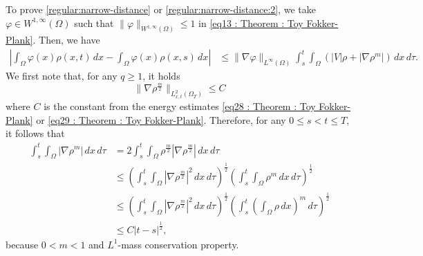 \documentclass{amsart}
\numberwithin{equation}{section}
\begin{document}
To prove \eqref{regular:narrow-distance} or \eqref{regular:narrow-distance:2}, we take $\varphi \in W^{1,\infty}(\Omega)$ such that $\|\varphi\|_{W^{1,\infty}(\Omega)} \leq 1$ in \eqref{eq13 : Theorem : Toy Fokker-Plank}. Then, we have
\begin{equation}\label{eq26 : Theorem : Toy Fokker-Plank}
\begin{aligned}
 \left | \int_{\Omega}\varphi(x) \rho(x,t) \,dx - \int_{\Omega}\varphi(x) \rho(x,s)\,dx \right |
&\leq \|\nabla \varphi\|_{L^\infty(\Omega)} \int_{s}^{t} \int_{\Omega}  \left (| V |\rho + | \nabla  \rho^m | \right) \,dx\,d\tau.%
\end{aligned}
\end{equation}
We first note that, for any $q\geq 1$, it holds
\begin{equation*}
\|\nabla \rho^{\frac{m}{2}}\|_{L^{2}_{x,t}(\Omega_T)} \leq C
\end{equation*}
where $C$ is the constant from the energy estimates \eqref{eq28 : Theorem : Toy Fokker-Plank} or \eqref{eq29 : Theorem : Toy Fokker-Plank}.
Therefore, for any $0 \leq s<t \leq T$, it follows that 
\begin{equation}\label{eq30 : Theorem : Toy Fokker-Plank}
\begin{aligned}
  \int_{s}^{t} \int_{\Omega}   | \nabla  \rho^m |  \,dx\,d\tau %
&= 2\int_{s}^{t} \int_{\Omega}   \rho^{\frac{m}{2}} \left| \nabla  \rho^{\frac{m}{2}} \right| \,dx\,d\tau\\
&\leq \left( \int_{s}^{t} \int_{\Omega}   \left| \nabla  \rho^{\frac{m}{2}} \right|^2 \,dx\,d\tau \right)^{\frac{1}{2}}\left( \int_{s}^{t} \int_{\Omega}   \rho^m \,dx\,d\tau \right)^{\frac{1}{2}}\\
&\leq \left( \int_{s}^{t} \int_{\Omega}   \left| \nabla  \rho^{\frac{m}{2}} \right|^2 \,dx\,d\tau \right)^{\frac{1}{2}} \left( \int_{s}^{t} \left (\int_{\Omega}   \rho \,dx \right)^m \,d\tau \right)^{\frac{1}{2}}\\
&\leq C |t-s|^{\frac{1}{2}},
\end{aligned}
\end{equation}
because $0<m<1$ and $L^1$-mass conservation property. 
\end{document}
